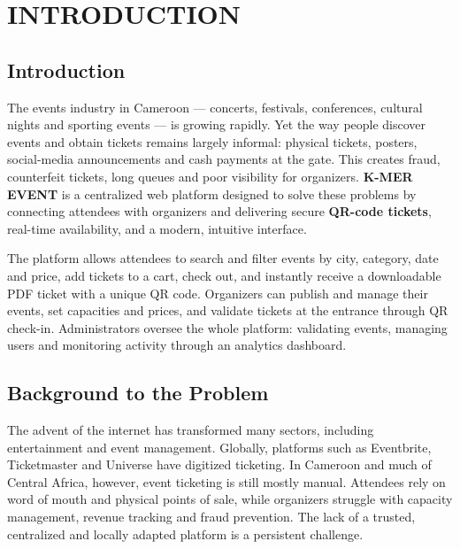 \documentclass[12pt,a4paper]{report}
\begin{document}
\clearpage
{}

\chapter{INTRODUCTION}

\section{Introduction}
The events industry in Cameroon --- concerts, festivals, conferences, cultural nights and
sporting events --- is growing rapidly. Yet the way people discover events and obtain
tickets remains largely informal: physical tickets, posters, social-media announcements and
cash payments at the gate. This creates fraud, counterfeit tickets, long queues and poor
visibility for organizers. \textbf{K-MER EVENT} is a centralized web platform designed to
solve these problems by connecting attendees with organizers and delivering secure
\textbf{QR-code tickets}, real-time availability, and a modern, intuitive interface.

The platform allows attendees to search and filter events by city, category, date and
price, add tickets to a cart, check out, and instantly receive a downloadable PDF ticket
with a unique QR code. Organizers can publish and manage their events, set capacities and
prices, and validate tickets at the entrance through QR check-in. Administrators oversee the
whole platform: validating events, managing users and monitoring activity through an
analytics dashboard.

\section{Background to the Problem}
The advent of the internet has transformed many sectors, including entertainment and event
management. Globally, platforms such as Eventbrite, Ticketmaster and Universe have digitized
ticketing. In Cameroon and much of Central Africa, however, event ticketing is still mostly
manual. Attendees rely on word of mouth and physical points of sale, while organizers
struggle with capacity management, revenue tracking and fraud prevention. The lack of a
trusted, centralized and locally adapted platform is a persistent challenge.
\end{document}
